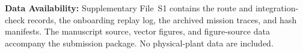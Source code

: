 \noindent\textbf{Data Availability:} Supplementary File~S1 contains the route and
integration-check records, the onboarding replay log, the archived mission
traces, and hash manifests. The manuscript source, vector figures, and
figure-source data accompany the submission package. No physical-plant data
are included.
